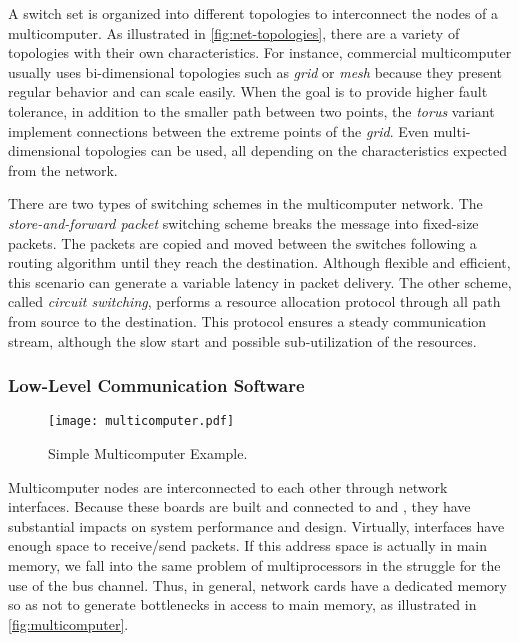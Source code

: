 				A switch set is organized into different topologies to interconnect
				the nodes of a multicomputer.
				As illustrated in \autoref{fig:net-topologies}, there are a
				variety of topologies with their own characteristics.
				For instance, commercial multicomputer usually uses bi-dimensional
				topologies such as \textit{grid} or \textit{mesh} because they present
				regular behavior and can scale easily.
				When the goal is to provide higher fault tolerance, in addition to the
				smaller path between two points, the \textit{torus} variant implement
				connections between the extreme points of the \textit{grid}.
				Even multi-dimensional topologies can be used, all depending on the
				characteristics expected from the network.

				There are two types of switching schemes in the multicomputer network.
				The \textit{store-and-forward packet} switching scheme breaks the message
				into fixed-size packets.
				The packets are copied and moved between the switches following a
				routing algorithm until they reach the destination.
				Although flexible and efficient, this scenario can generate a variable
				latency in packet delivery.
				The other scheme, called \textit{circuit switching}, performs a resource
				allocation protocol through all path from source to the destination.
				This protocol ensures a steady communication stream, although the
				slow start and possible sub-utilization of the resources.

			\subsubsection{Low-Level Communication Software}
			\label{sec.multicomputers-low-sw}

				\begin{figure}[!tb]
					\centering%
					\caption{Simple Multicomputer Example.}%
					\label{fig:multicomputer}%
					\texttt{[image: multicomputer.pdf]}%
				\end{figure}

				Multicomputer nodes are interconnected to each other through network interfaces.
				Because these boards are built and connected to \cpus and \ram,
				they have substantial impacts on system performance and \os design.
				Virtually, interfaces have enough \ram space to receive/send packets.
				If this address space is actually in main memory, we fall into the same
				problem of multiprocessors in the struggle for the use of the bus channel.
				Thus, in general, network cards have a dedicated memory so as not to
				generate bottlenecks in access to main memory, as illustrated in \autoref{fig:multicomputer}.

